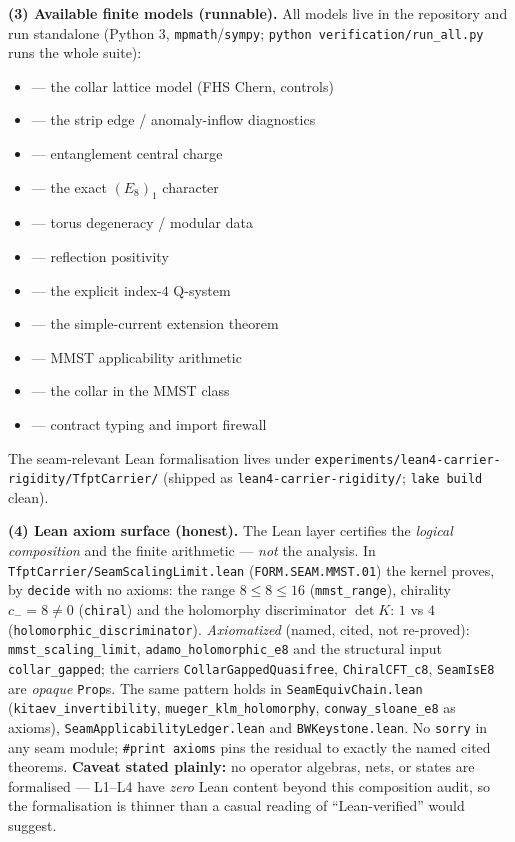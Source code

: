 \par\smallskip\noindent\textbf{(3) Available finite models (runnable).} All models live in the
repository and run standalone (Python 3, \texttt{mpmath}/\texttt{sympy}; \texttt{python
verification/run\_all.py} runs the whole suite):
\begin{itemize}
\item {} --- the collar lattice model (FHS Chern, controls)
\item {} --- the strip edge / anomaly-inflow diagnostics
\item {} --- entanglement central charge
\item {} --- the exact $(E_8)_1$ character
\item {} --- torus degeneracy / modular data
\item {} --- reflection positivity
\item {} --- the explicit index-$4$ Q-system
\item {} --- the simple-current extension theorem
\item {} --- MMST applicability arithmetic
\item {} --- the collar in the MMST class
\item {} --- contract typing and import firewall
\end{itemize}
The seam-relevant Lean formalisation lives under
\texttt{experiments/\allowbreak lean4-carrier-rigidity/\allowbreak TfptCarrier/} (shipped as
\texttt{lean4-carrier-rigidity/}; \texttt{lake build} clean).

\par\smallskip\noindent\textbf{(4) Lean axiom surface (honest).} The Lean layer certifies the
\emph{logical composition} and the finite arithmetic --- \emph{not} the analysis. In
\texttt{TfptCarrier/SeamScalingLimit.lean} (\texttt{FORM.SEAM.MMST.01}) the kernel proves, by
\texttt{decide} with no axioms: the range $8\le8\le16$ (\texttt{mmst\_range}), chirality
$c_-=8\neq0$ (\texttt{chiral}) and the holomorphy discriminator $\det K$: $1$ vs $4$
(\texttt{holomorphic\_discriminator}). \emph{Axiomatized} (named, cited, not re-proved):
\texttt{mmst\_scaling\_limit}, \texttt{adamo\_holomorphic\_e8} and the structural input
\texttt{collar\_gapped}; the carriers \texttt{CollarGappedQuasifree}, \texttt{ChiralCFT\_c8},
\texttt{SeamIsE8} are \emph{opaque} \texttt{Prop}s. The same pattern holds in
\texttt{SeamEquivChain.lean} (\texttt{kitaev\_invertibility}, \texttt{mueger\_klm\_holomorphy},
\texttt{conway\_sloane\_e8} as axioms), \texttt{SeamApplicabilityLedger.lean} and
\texttt{BWKeystone.lean}. No \texttt{sorry} in any seam module; \texttt{\#print axioms} pins the
residual to exactly the named cited theorems. \textbf{Caveat stated plainly:} no operator
algebras, nets, or states are formalised --- L1--L4 have \emph{zero} Lean content beyond this
composition audit, so the formalisation is thinner than a casual reading of ``Lean-verified''
would suggest.

